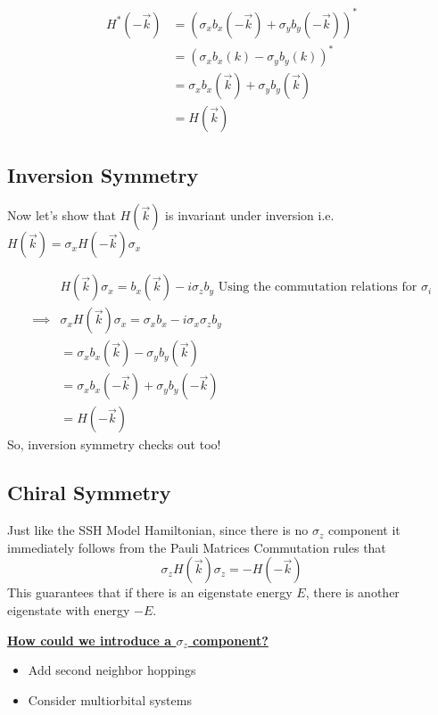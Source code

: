 \documentclass[11pt]{article}
\begin{document}
\begin{align*}
  H^*(-\vec{k}) &= \left( \sigma_x b_x(-\vec{k}) + \sigma_y b_y(-\vec{k}) \right)^* \\
  &= \left( \sigma_x b_x(k) - \sigma_y b_y(k) \right)^* \\
  &= \sigma_x b_x(\vec{k}) + \sigma_y b_y(\vec{k}) \\
  &= H(\vec{k})
\end{align*}

\vskip 1cm
\subsection{Inversion Symmetry}
Now let's show that $H(\vec{k})$ is invariant under inversion i.e. $H(\vec{k}) = \sigma_x H(-\vec{k})\sigma_x$

\begin{align*}
  &H(\vec{k}) \sigma_x = b_x(\vec{k}) - i\sigma_z b_y \text{ Using the commutation relations for $\sigma_i$} \\
  \implies& \sigma_x H(\vec{k}) \sigma_x = \sigma_x b_x - i \sigma_x \sigma_z b_y \\
  &= \sigma_x b_x(\vec{k}) - \sigma_y b_y(\vec{k}) \\
  &= \sigma_x b_x(-\vec{k}) + \sigma_y b_y(-\vec{k}) \\
  &= H(-\vec{k})
\end{align*} So, inversion symmetry checks out too!

\subsection{Chiral Symmetry}
Just like the SSH Model Hamiltonian, since there is no $\sigma_z$ component it immediately follows from the Pauli Matrices Commutation rules that $$ \sigma_z H(\vec{k}) \sigma_z = - H(-\vec{k}) $$ This guarantees that if there is an eigenstate energy $E$, there is another eigenstate with energy $-E$.

\begin{redbox}
  \textbf{\underline{How could we introduce a $\sigma_z$ component?}} 
  \begin{itemize}
    \item Add second neighbor hoppings
    \item Consider multiorbital systems
  \end{itemize}
\end{redbox}
\end{document}

